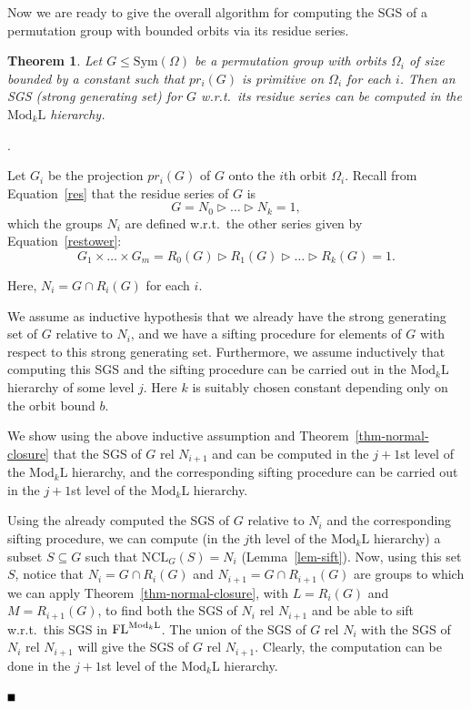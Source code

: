 \documentclass[11pt]{article}
\newtheorem{theorem}{Theorem}[section]
\newcommand{\bproof}{\noindent{\it Proof}}
\newcommand{\eproof}{\hspace*{\fill}$\rule{2mm}{2mm}$~~~~~\bigskip}
\renewenvironment{proof}{\bproof. }{\eproof}
\newcommand{\Mod}[1]{\ensuremath{\mathrm{Mod}_{#1}\mathrm{L}}}
\newcommand{\FL}{\mbox{\rm FL}}
\newcommand{\NCL}[2]{\ensuremath{\mathrm{NCL}_{#1}({#2})}}
\newcommand{\Sym}[1]{\ensuremath{\mathrm{Sym}\left({#1}\right)}}
\newcommand{\pr}[2]{\ensuremath{pr_{#1}\left({#2}\right)}}
\begin{document}
Now we are ready to give the overall algorithm for computing the SGS
of a permutation group with bounded orbits via its residue series.

\begin{theorem}\label{thm-SGS}
  Let $G\leq\Sym{\Omega}$ be a permutation group with orbits
  $\Omega_i$ of size bounded by a constant such that $\pr{i}{G}$ is
  primitive on $\Omega_i$ for each $i$. Then an SGS (strong generating
  set) for $G$ w.r.t.\ its residue series can be computed in the
  $\Mod{k}$ hierarchy.
\end{theorem}

\begin{proof}  

Let $G_i$ be the projection $\pr{i}{G}$ of $G$ onto the $i$th orbit
$\Omega_i$. Recall from Equation~\ref{res} that the residue
series of $G$ is
\[
G = N_0 \rhd \ldots \rhd N_k = 1,
\]
which the groups $N_i$ are defined w.r.t.\ the other series given by
Equation~\ref{restower}:
\[
G_1 \times \ldots \times G_m = R_0(G) \rhd R_1(G) \rhd \ldots \rhd
R_k(G) = 1.
\]

Here, $N_i = G \cap R_i(G)$ for each $i$.

We assume as inductive hypothesis that we already have the strong
generating set of $G$ relative to $N_i$, and we have a sifting
procedure for elements of $G$ with respect to this strong generating
set. Furthermore, we assume inductively that computing this SGS and
the sifting procedure can be carried out in the $\Mod{k}$ hierarchy of
some level $j$. Here $k$ is suitably chosen constant depending only on
the orbit bound $b$.

We show using the above inductive assumption and
Theorem~\ref{thm-normal-closure} that the SGS of $G$ rel $N_{i+1}$ and
can be computed in the $j+1$st level of the $\Mod{k}$ hierarchy, and
the corresponding sifting procedure can be carried out in the $j+1$st
level of the $\Mod{k}$ hierarchy.

Using the already computed the SGS of $G$ relative to $N_i$ and the
corresponding sifting procedure, we can compute (in the $j$th level of
the $\Mod{k}$ hierarchy) a subset $S \subseteq G$ such that
$\NCL{G}{S} = N_{i}$ (Lemma~\ref{lem-sift}). Now, using this set $S$,
notice that $N_i=G\cap R_i(G)$ and $N_{i+1}=G\cap R_{i+1}(G)$ are
groups to which we can apply Theorem~\ref{thm-normal-closure}, with
$L=R_i(G)$ and $M=R_{i+1}(G)$, to find both the SGS of $N_i$ rel
$N_{i+1}$ and be able to sift w.r.t.\ this SGS in $\FL^{\Mod{k}}$.
The union of the SGS of $G$ rel $N_i$ with the SGS of $N_i$ rel
$N_{i+1}$ will give the SGS of $G$ rel $N_{i+1}$. Clearly, the
computation can be done in the $j+1$st level of the $\Mod{k}$
hierarchy.


\end{proof}
\end{document}
